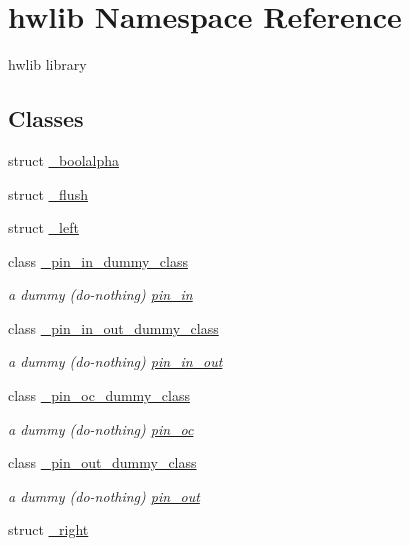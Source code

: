 \hypertarget{namespacehwlib}{}\section{hwlib Namespace Reference}
\label{namespacehwlib}


hwlib library  


\subsection*{Classes}
\begin{DoxyCompactItemize}
\item 
struct \hyperlink{structhwlib_1_1__boolalpha}{\+\_\+boolalpha}
\item 
struct \hyperlink{structhwlib_1_1__flush}{\+\_\+flush}
\item 
struct \hyperlink{structhwlib_1_1__left}{\+\_\+left}
\item 
class \hyperlink{classhwlib_1_1__pin__in__dummy__class}{\+\_\+pin\+\_\+in\+\_\+dummy\+\_\+class}
\begin{DoxyCompactList}\small\item\em a dummy (do-\/nothing) \hyperlink{classhwlib_1_1pin__in}{pin\+\_\+in} \end{DoxyCompactList}\item 
class \hyperlink{classhwlib_1_1__pin__in__out__dummy__class}{\+\_\+pin\+\_\+in\+\_\+out\+\_\+dummy\+\_\+class}
\begin{DoxyCompactList}\small\item\em a dummy (do-\/nothing) \hyperlink{classhwlib_1_1pin__in__out}{pin\+\_\+in\+\_\+out} \end{DoxyCompactList}\item 
class \hyperlink{classhwlib_1_1__pin__oc__dummy__class}{\+\_\+pin\+\_\+oc\+\_\+dummy\+\_\+class}
\begin{DoxyCompactList}\small\item\em a dummy (do-\/nothing) \hyperlink{classhwlib_1_1pin__oc}{pin\+\_\+oc} \end{DoxyCompactList}\item 
class \hyperlink{classhwlib_1_1__pin__out__dummy__class}{\+\_\+pin\+\_\+out\+\_\+dummy\+\_\+class}
\begin{DoxyCompactList}\small\item\em a dummy (do-\/nothing) \hyperlink{classhwlib_1_1pin__out}{pin\+\_\+out} \end{DoxyCompactList}\item 
struct \hyperlink{structhwlib_1_1__right}{\+\_\+right}

\end{DoxyCompactItemize}
